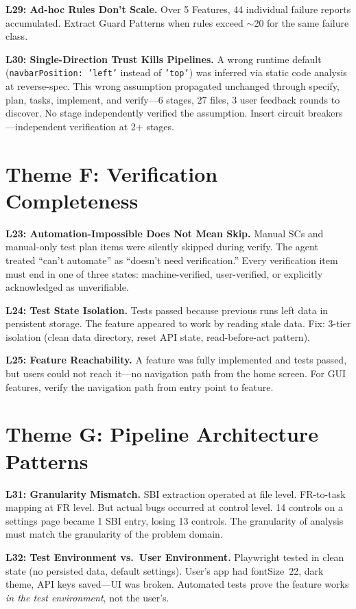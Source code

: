 \documentclass[11pt,a4paper,openright,twoside]{report}
\begin{document}
\textbf{L29: Ad-hoc Rules Don't Scale.} Over 5 Features, 44 individual failure reports accumulated. Extract Guard Patterns when rules exceed $\sim$20 for the same failure class.

\textbf{L30: Single-Direction Trust Kills Pipelines.} A wrong runtime default (\texttt{navbarPosition: 'left'} instead of \texttt{'top'}) was inferred via static code analysis at reverse-spec. This wrong assumption propagated unchanged through specify, plan, tasks, implement, and verify---6 stages, 27 files, 3 user feedback rounds to discover. No stage independently verified the assumption. Insert circuit breakers---independent verification at 2+ stages.

\section{Theme F: Verification Completeness}

\textbf{L23: Automation-Impossible Does Not Mean Skip.} Manual SCs and manual-only test plan items were silently skipped during verify. The agent treated ``can't automate'' as ``doesn't need verification.'' Every verification item must end in one of three states: machine-verified, user-verified, or explicitly acknowledged as unverifiable.

\textbf{L24: Test State Isolation.} Tests passed because previous runs left data in persistent storage. The feature appeared to work by reading stale data. Fix: 3-tier isolation (clean data directory, reset API state, read-before-act pattern).

\textbf{L25: Feature Reachability.} A feature was fully implemented and tests passed, but users could not reach it---no navigation path from the home screen. For GUI features, verify the navigation path from entry point to feature.

\section{Theme G: Pipeline Architecture Patterns}

\textbf{L31: Granularity Mismatch.} SBI extraction operated at file level. FR-to-task mapping at FR level. But actual bugs occurred at control level. 14 controls on a settings page became 1 SBI entry, losing 13 controls. The granularity of analysis must match the granularity of the problem domain.

\textbf{L32: Test Environment vs.\ User Environment.} Playwright tested in clean state (no persisted data, default settings). User's app had fontSize~22, dark theme, API keys saved---UI was broken. Automated tests prove the feature works \emph{in the test environment}, not the user's.
\end{document}
